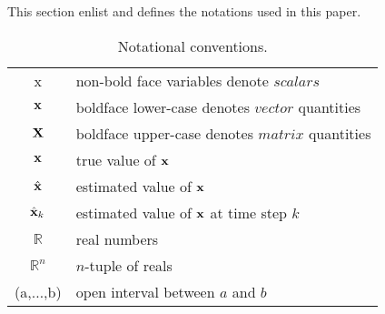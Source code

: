 \cyan
This section enlist and defines the notations used in this paper.
\begin{table}[h!]
	\centering
	\begin{tabular}[h]{|c|l|}
		\hline
		x 				& non-bold face variables denote $scalars$ 			\T \\
		$\mathbf{x}$ 		& boldface lower-case denotes $vector$ quantities	\T \\ 	
		$\mathbf{X}$ 		& boldface upper-case denotes $matrix$ quantities	\T \\
		$\mathbf{x}$ 		& true value of $\mathbf{x}$ 							\T \\  	
		$\hat{\mathbf{x}}$ 	& estimated value of $\mathbf{x}$						\T \\	
		$\hat{\mathbf{x}}_{k}$ & estimated value of $\mathbf{x}$ at time step $k$	\T \\	
		$\mathbb{R}$ 	& real numbers										\T \\ 	
		$\mathbb{R}^n$ 	& $n$-tuple of reals								\T \\
		(a,$\dots$,b) 	& open interval	between $a$ and $b$					\T \\
		\hline
		
	\end{tabular}
	\caption{Notational conventions.}
	\label{table:notation}
\end{table}

\black